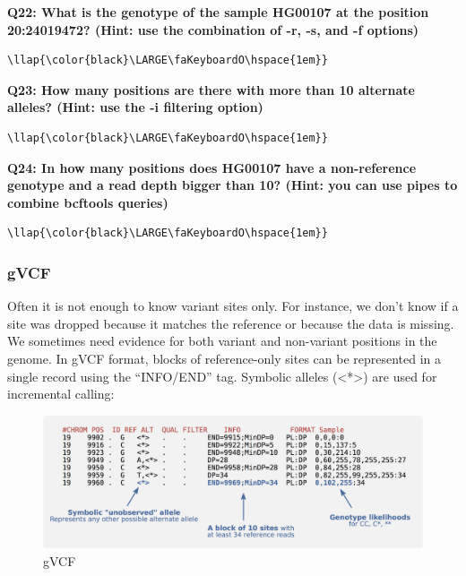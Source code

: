 \documentclass[11pt]{article}
\makeatletter
\def\maxwidth{\ifdim\Gin@nat@width>\linewidth\linewidth
    \else\Gin@nat@width\fi}
\let\Oldincludegraphics\includegraphics
\renewcommand{\includegraphics}[1]{\Oldincludegraphics[width=.8\maxwidth, height=.55\textheight, keepaspectratio]{#1}}
\makeatother
\begin{document}
    \textbf{Q22: What is the genotype of the sample HG00107 at the position
20:24019472? (Hint: use the combination of -r, -s, and -f options)}

\begin{terminalinput}
\begin{Verbatim}[commandchars=\\\{\}]
\llap{\color{black}\LARGE\faKeyboardO\hspace{1em}}
\end{Verbatim}
\end{terminalinput}

    \textbf{Q23: How many positions are there with more than 10 alternate
alleles? (Hint: use the -i filtering option)}

\begin{terminalinput}
\begin{Verbatim}[commandchars=\\\{\}]
\llap{\color{black}\LARGE\faKeyboardO\hspace{1em}}
\end{Verbatim}
\end{terminalinput}

    \textbf{Q24: In how many positions does HG00107 have a non-reference
genotype and a read depth bigger than 10? (Hint: you can use pipes to
combine bcftools queries)}

\begin{terminalinput}
\begin{Verbatim}[commandchars=\\\{\}]
\llap{\color{black}\LARGE\faKeyboardO\hspace{1em}}
\end{Verbatim}
\end{terminalinput}

    \hypertarget{gvcf}{%
\subsubsection{gVCF}\label{gvcf}}

Often it is not enough to know variant sites only. For instance, we
don't know if a site was dropped because it matches the reference or
because the data is missing. We sometimes need evidence for both variant
and non-variant positions in the genome. In gVCF format, blocks of
reference-only sites can be represented in a single record using the
``INFO/END'' tag. Symbolic alleles (\textless{}*\textgreater{}) are used
for incremental calling:

    \begin{figure}[H]
\centering
\includegraphics{img/gVCF.png}
\caption{gVCF}
\end{figure}
\end{document}
